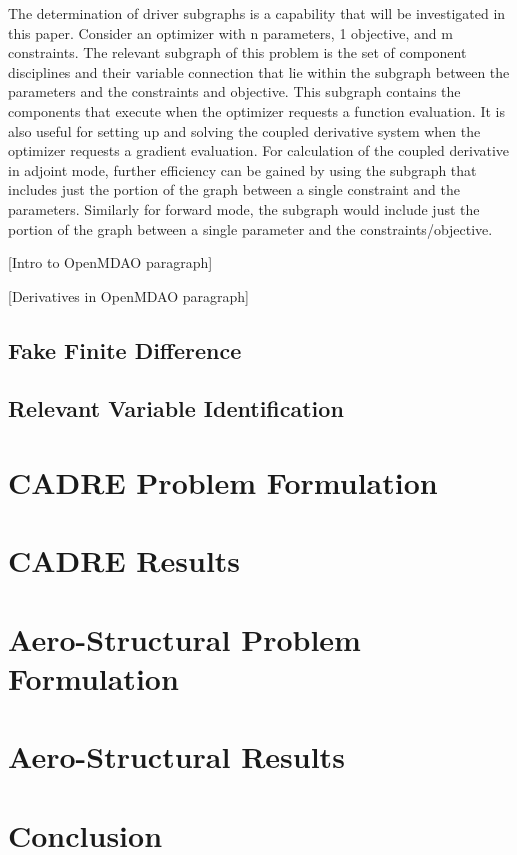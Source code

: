 \documentclass[]{aiaa-tc} %
\begin{document}
    The determination of driver subgraphs is a capability that will be investigated in this paper.
    Consider an optimizer with n parameters, 1 objective, and m constraints. The relevant 
    subgraph of this problem is the set of component disciplines and their variable connection that
    lie within the subgraph between the parameters and the constraints and objective. This subgraph
    contains the components that execute when the optimizer requests a function evaluation. It is
    also useful for setting up and solving the coupled derivative system when the optimizer requests
    a gradient evaluation. For calculation of the coupled derivative in adjoint mode, further
    efficiency can be gained by using the subgraph that includes just the portion of the graph 
    between a single constraint and the parameters. Similarly for forward mode, the subgraph would
    include just the portion of the graph between a single parameter and the constraints/objective.

    [Intro to OpenMDAO paragraph]

    [Derivatives in OpenMDAO paragraph]


    \subsection{Fake Finite Difference}
    \subsection{Relevant Variable Identification}

  \section{CADRE Problem Formulation}

  \section{CADRE Results}

  \section{Aero-Structural Problem Formulation}

  \section{Aero-Structural Results}

  \section{Conclusion}
 
  
\end{document}
